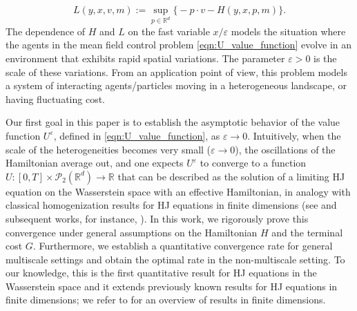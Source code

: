 \documentclass[reqno,11pt]{amsart}
\numberwithin{equation}{section}
\newcommand{\be}{\begin{equation}}
\newcommand{\ee}{\end{equation}}
\newcommand{\R}{\mathbb{R}} %
\newcommand{\e}{\varepsilon}
\newcommand{\nd}{\noindent}
\begin{document}
    \be\label{Lagr}
    L(y,x,v,m) := \sup_{p \in \R^d} \big\{ -p \cdot v - H(y,x,p,m) \big\}.
    \ee
    The dependence of $H$ and $L$ on the fast variable $x/\e$ models the situation where the agents in the mean field control problem \eqref{eqn:U_value_function} evolve in an environment that exhibits rapid spatial variations.
    The parameter $\e>0$ is the scale of these variations. From an application point of view, this problem models a system of interacting agents/particles moving in a heterogeneous landscape, or having fluctuating cost.
    \vspace{2mm}

    \nd
    Our first goal in this paper is to establish the asymptotic behavior of the value function $U^\e$, defined in \eqref{eqn:U_value_function}, as $\e\to0$. Intuitively, when the scale of the heterogeneities becomes very small ($\e\to 0$), the oscillations of the Hamiltonian average out, and one expects $U^\e$ to converge to a function $U\colon [0,T]\times\mathcal{P}_2(\R^d)\to \R$ that can be described as the solution of a limiting HJ equation on the Wasserstein space with an effective Hamiltonian, in analogy with classical homogenization results for HJ equations in finite dimensions (see \cite{LionsPapaVara1987} and subsequent works, for instance, \cite{capuzzo2001rate,MitakeTranYu2019, TranYu2021}).
    In this work, we rigorously prove this convergence under general assumptions on the Hamiltonian $H$ and the terminal cost $G$. Furthermore, we establish a quantitative convergence rate for general multiscale settings and obtain the optimal rate in the non-multiscale setting. To our knowledge, this is the first quantitative result for HJ equations in the Wasserstein space
    and it extends previously known results for HJ equations in finite dimensions; we refer to \cite{tran_hamilton-jacobi_2021} for an overview of results in finite dimensions.
    \vspace{2mm}
\end{document}
